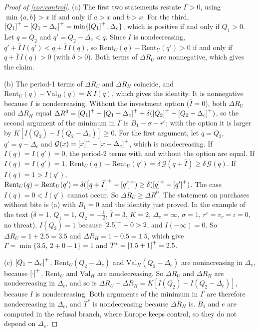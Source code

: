 \begin{proof}[Proof of \cref{cor:control}]
(a) The first two statements restate $\Gamma>0$, using $\min\{a,b\}>x$ if and only if $a>x$ and $b>x$. For the third, $\left[Q_1\right]^{+}-\left[Q_1-\Delta_c\right]^{+}=\min\{\left[Q_1\right]^{+},\Delta_c\}$, which is positive if and only if $Q_1>0$. Let $q=Q_2$ and $q'=Q_2-\Delta_c<q$. Since $I$ is nondecreasing, $q'+\bar I\,I(q')<q+\bar I\,I(q)$, so $\mathrm{Rent}_U(q)-\mathrm{Rent}_U(q')>0$ if and only if $q+\bar I\,I(q)>0$ (with $\delta>0$). Both terms of $\Delta R_U$ are nonnegative, which gives the claim.

(b) The period-1 terms of $\Delta R_U$ and $\Delta R_H$ coincide, and $\mathrm{Rent}_U(q)-\mathrm{Val}_H(q)=K\,I(q)$, which gives the identity. It is nonnegative because $I$ is nondecreasing. Without the investment option ($\bar I=0$), both $\Delta R_U$ and $\Delta R_H$ equal $\Delta R^0=\left[Q_1\right]^{+}-\left[Q_1-\Delta_c\right]^{+}+\delta(\left[Q_2\right]^{+}-\left[Q_2-\Delta_c\right]^{+})$, so the second argument of the minimum in $\Gamma$ is $B_1-\sigma-r^c$; with the option it is larger by $K[I(Q_2)-I(Q_2-\Delta_c)]\ge 0$. For the first argument, let $q=Q_2$, $q'=q-\Delta_c$ and $\mathcal G(x)=\left[x\right]^{+}-\left[x-\Delta_c\right]^{+}$, which is nondecreasing. If $I(q)=I(q')=0$, the period-2 terms with and without the option are equal. If $I(q)=I(q')=1$, $\mathrm{Rent}_U(q)-\mathrm{Rent}_U(q')=\delta\,\mathcal G(q+\bar I)\ge\delta\,\mathcal G(q)$. If $I(q)=1>I(q')$, $\mathrm{Rent}_U(q)-\mathrm{Rent}_U(q')=\delta(\left[q+\bar I\right]^{+}-\left[q'\right]^{+})\ge\delta(\left[q\right]^{+}-\left[q'\right]^{+})$. The case $I(q)=0<I(q')$ cannot occur. So $\Delta R_U\ge\Delta R^0$. The statement on purchases without bite is (a) with $B_1=0$ and the identity just proved. In the example of the text ($\delta=1$, $Q_1=1$, $Q_2=-\tfrac12$, $\bar I=3$, $K=2$, $\Delta_c=\infty$, $\sigma=1$, $r^c=v_c=\iota=0$, no threat), $I(Q_2)=1$ because $\left[2.5\right]^{+}-0>2$, and $I(-\infty)=0$. So $\Delta R_U=1+2.5=3.5$ and $\Delta R_H=1+0.5=1.5$, which give $\Gamma=\min\{3.5,\,2+0-1\}=1$ and $T^*=\left[1.5+1\right]^{+}=2.5$.

(c) $\left[Q_1-\Delta_c\right]^{+}$, $\mathrm{Rent}_U(Q_2-\Delta_c)$ and $\mathrm{Val}_H(Q_2-\Delta_c)$ are nonincreasing in $\Delta_c$, because $\left[\cdot\right]^{+}$, $\mathrm{Rent}_U$ and $\mathrm{Val}_H$ are nondecreasing. So $\Delta R_U$ and $\Delta R_H$ are nondecreasing in $\Delta_c$, and so is $\Delta R_U-\Delta R_H=K[I(Q_2)-I(Q_2-\Delta_c)]$, because $I$ is nondecreasing. Both arguments of the minimum in $\Gamma$ are therefore nondecreasing in $\Delta_c$, and $T^*$ is nondecreasing because $\Delta R_H$ is. $B_1$ and $e$ are computed in the refusal branch, where Europe keeps control, so they do not depend on $\Delta_c$.


\end{proof}
